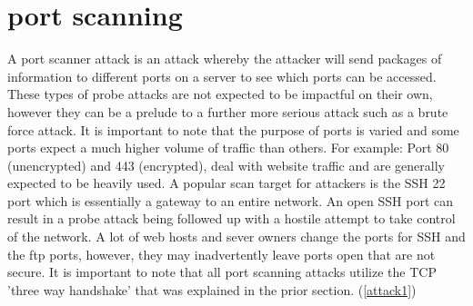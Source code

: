\section{port scanning}
A port scanner attack is an attack whereby the attacker will send packages of information to different ports on a server to see which ports can be accessed. These types of probe attacks are not expected to be impactful on their own, however they can be a prelude to a further more serious attack such as a brute force attack. It is important to note that the purpose of ports is varied and some ports expect a much higher volume of traffic than others. For example: Port 80 (unencrypted) and 443 (encrypted), deal with website traffic and are generally expected to be heavily used. A popular scan target for attackers is the SSH 22 port which is essentially a gateway to an entire network. An open SSH port can result in a probe attack being followed up with a hostile attempt to take control of the network. A lot of web hosts and sever owners change the ports for SSH and the ftp ports, however, they may inadvertently leave ports open that are not secure. It is important to note that all port scanning attacks utilize the TCP 'three way handshake' that was explained in the prior section. (\ref{attack1})
